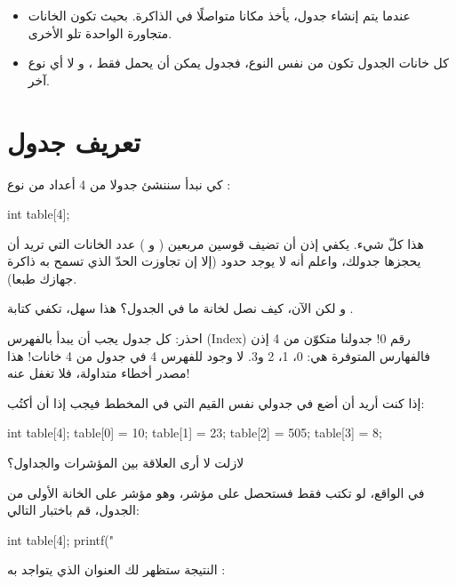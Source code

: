 \begin{itemize}
  \item عندما يتم إنشاء جدول، يأخذ مكانا متواصلًا في الذاكرة. بحيث تكون الخانات متجاورة الواحدة تلو الأخرى.
  \item كل خانات الجدول تكون من نفس النوع، فجدول
يمكن أن يحمل فقط
،
و لا أي نوع آخر.
\end{itemize}

\section{تعريف جدول}

كي نبدأ سننشئ جدولا من 4 أعداد من نوع
:

\begin{Csource}
int table[4];
\end{Csource}

هذا كلّ شيء. يكفي إذن أن تضيف قوسين مربعين
(\InlineCode{[}
و
\InlineCode{]})
عدد الخانات التي تريد أن يحجزها جدولك، واعلم أنه لا يوجد حدود (إلا إن تجاوزت الحدّ الذي تسمح به ذاكرة جهازك طبعا).

و لكن الآن، كيف نصل لخانة ما في الجدول؟
هذا سهل، تكفي كتابة
.

\begin{critical}
 احذر: كل جدول يجب أن يبدأ بالفهرس
(\textenglish{Index})
رقم 0! جدولنا متكوّن من 4
إذن فالفهارس المتوفرة هي: 0، 1، 2 و3. لا وجود للفهرس 4 في جدول من 4 خانات! هذا مصدر أخطاء متداولة، فلا تغفل عنه!

\end{critical}

إذا كنت أريد أن أضع في جدولي نفس القيم التي في المخطط فيجب إذا أن أكتُب:

\begin{Csource}
int table[4];
table[0] = 10;
table[1] = 23;
table[2] = 505;
table[3] = 8;
\end{Csource}

\begin{question}
  لازلت لا أرى العلاقة بين المؤشرات والجداول؟
\end{question}

في الواقع، لو تكتب فقط
فستحصل على مؤشر، وهو مؤشر على الخانة الأولى من الجدول، قم باختبار التالي:

\begin{Csource}
int table[4];
printf("%
\end{Csource}

النتيجة ستظهر لك العنوان الذي يتواجد به
:

